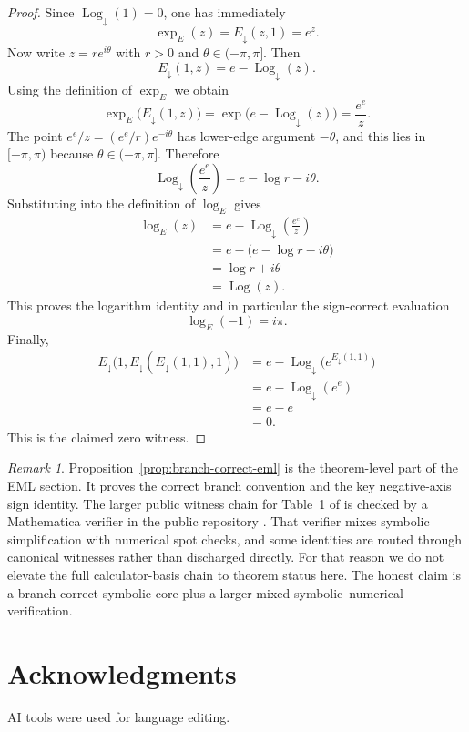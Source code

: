 \documentclass[11pt]{amsart}
\numberwithin{equation}{section}
\theoremstyle{remark}
\newtheorem{remark}[theorem]{Remark}
\theoremstyle{definition}
\newcommand{\Logdown}{\operatorname{Log}_{\downarrow}}
\newcommand{\Logp}{\operatorname{Log}}
\begin{document}
\begin{proof}
Since $\Logdown(1)=0$, one has immediately
\[
\exp_E(z)=E_{\downarrow}(z,1)=e^z.
\]
Now write $z=re^{i\theta}$ with $r>0$ and $\theta\in(-\pi,\pi]$. Then
\[
E_{\downarrow}(1,z)=e-\Logdown(z).
\]
Using the definition of $\exp_E$ we obtain
\[
\exp_E\bigl(E_{\downarrow}(1,z)\bigr)
=\exp\bigl(e-\Logdown(z)\bigr)
=\frac{e^e}{z}.
\]
The point $e^e/z=(e^e/r)e^{-i\theta}$ has lower-edge argument $-\theta$, and this lies in $[-\pi,\pi)$ because $\theta\in(-\pi,\pi]$. Therefore
\[
\Logdown\!\left(\frac{e^e}{z}\right)=e-\log r-i\theta.
\]
Substituting into the definition of $\log_E$ gives
\begin{align*}
\log_E(z)
&=e-\Logdown\!\left(\frac{e^e}{z}\right) \\
&=e-\bigl(e-\log r-i\theta\bigr) \\
&=\log r+i\theta \\
&=\Logp(z).
\end{align*}
This proves the logarithm identity and in particular the sign-correct evaluation
\[
\log_E(-1)=i\pi.
\]
Finally,
\begin{align*}
E_{\downarrow}\bigl(1,E_{\downarrow}(E_{\downarrow}(1,1),1)\bigr)
&=e-\Logdown\bigl(e^{E_{\downarrow}(1,1)}\bigr) \\
&=e-\Logdown(e^e) \\
&=e-e \\
&=0.
\end{align*}
This is the claimed zero witness.
\end{proof}

\begin{remark}
Proposition~\ref{prop:branch-correct-eml} is the theorem-level part of the EML section. It proves the correct branch convention and the key negative-axis sign identity. The larger public witness chain for Table~1 of \cite{Odrzywolek2026} is checked by a Mathematica verifier in the public repository \cite{OdrzywolekRepo,OdrzywolekVerifier}. That verifier mixes symbolic simplification with numerical spot checks, and some identities are routed through canonical witnesses rather than discharged directly. For that reason we do not elevate the full calculator-basis chain to theorem status here. The honest claim is a branch-correct symbolic core plus a larger mixed symbolic--numerical verification.
\end{remark}

\section*{Acknowledgments}

AI tools were used for language editing.



\end{document}
